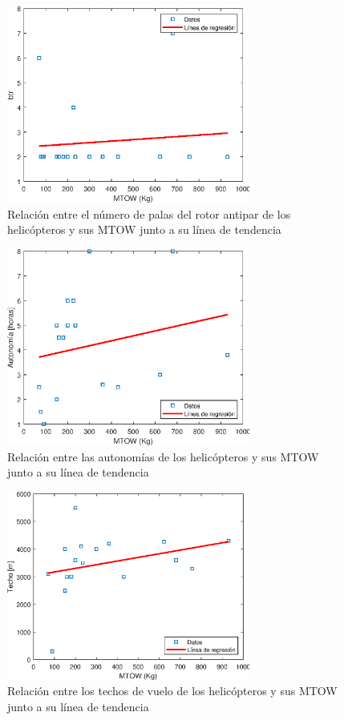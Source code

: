 \begin{figure}
	\centering
	\includegraphics[width=80mm]{graficos/analbtr}
	\caption{Relación entre el número de palas del rotor antipar de los helicópteros y sus MTOW junto a su línea de tendencia}
\end{figure}
\begin{figure}
	\centering
	\includegraphics[width=80mm]{graficos/analaut}
	\caption{Relación entre las autonomías de los helicópteros y sus MTOW junto a su línea de tendencia}
\end{figure}
\begin{figure}
	\centering
	\includegraphics[width=80mm]{graficos/analtecho}
	\caption{Relación entre los techos de vuelo de los helicópteros y sus MTOW junto a su línea de tendencia}
\end{figure}
